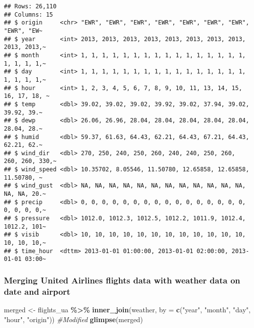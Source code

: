 \documentclass[
]{article}
\newenvironment{Shaded}{\begin{snugshade}}{\end{snugshade}}
\newcommand{\AttributeTok}[1]{\textcolor[rgb]{0.13,0.29,0.53}{#1}}
\newcommand{\CommentTok}[1]{\textcolor[rgb]{0.56,0.35,0.01}{\textit{#1}}}
\newcommand{\FunctionTok}[1]{\textcolor[rgb]{0.13,0.29,0.53}{\textbf{#1}}}
\newcommand{\NormalTok}[1]{#1}
\newcommand{\OtherTok}[1]{\textcolor[rgb]{0.56,0.35,0.01}{#1}}
\newcommand{\SpecialCharTok}[1]{\textcolor[rgb]{0.81,0.36,0.00}{\textbf{#1}}}
\newcommand{\StringTok}[1]{\textcolor[rgb]{0.31,0.60,0.02}{#1}}
\begin{document}
\begin{verbatim}
## Rows: 26,110
## Columns: 15
## $ origin     <chr> "EWR", "EWR", "EWR", "EWR", "EWR", "EWR", "EWR", "EWR", "EW~
## $ year       <int> 2013, 2013, 2013, 2013, 2013, 2013, 2013, 2013, 2013, 2013,~
## $ month      <int> 1, 1, 1, 1, 1, 1, 1, 1, 1, 1, 1, 1, 1, 1, 1, 1, 1, 1, 1, 1,~
## $ day        <int> 1, 1, 1, 1, 1, 1, 1, 1, 1, 1, 1, 1, 1, 1, 1, 1, 1, 1, 1, 1,~
## $ hour       <int> 1, 2, 3, 4, 5, 6, 7, 8, 9, 10, 11, 13, 14, 15, 16, 17, 18, ~
## $ temp       <dbl> 39.02, 39.02, 39.02, 39.92, 39.02, 37.94, 39.02, 39.92, 39.~
## $ dewp       <dbl> 26.06, 26.96, 28.04, 28.04, 28.04, 28.04, 28.04, 28.04, 28.~
## $ humid      <dbl> 59.37, 61.63, 64.43, 62.21, 64.43, 67.21, 64.43, 62.21, 62.~
## $ wind_dir   <dbl> 270, 250, 240, 250, 260, 240, 240, 250, 260, 260, 260, 330,~
## $ wind_speed <dbl> 10.35702, 8.05546, 11.50780, 12.65858, 12.65858, 11.50780, ~
## $ wind_gust  <dbl> NA, NA, NA, NA, NA, NA, NA, NA, NA, NA, NA, NA, NA, NA, 20.~
## $ precip     <dbl> 0, 0, 0, 0, 0, 0, 0, 0, 0, 0, 0, 0, 0, 0, 0, 0, 0, 0, 0, 0,~
## $ pressure   <dbl> 1012.0, 1012.3, 1012.5, 1012.2, 1011.9, 1012.4, 1012.2, 101~
## $ visib      <dbl> 10, 10, 10, 10, 10, 10, 10, 10, 10, 10, 10, 10, 10, 10, 10,~
## $ time_hour  <dttm> 2013-01-01 01:00:00, 2013-01-01 02:00:00, 2013-01-01 03:00~
\end{verbatim}

\subsubsection{Merging United Airlines flights data with weather data on
date and
airport}\label{merging-united-airlines-flights-data-with-weather-data-on-date-and-airport}

\begin{Shaded}
\begin{Highlighting}[]
\NormalTok{merged }\OtherTok{\textless{}{-}}\NormalTok{ flights\_ua }\SpecialCharTok{\%\textgreater{}\%}
  \FunctionTok{inner\_join}\NormalTok{(weather, }\AttributeTok{by =} \FunctionTok{c}\NormalTok{(}\StringTok{"year"}\NormalTok{, }\StringTok{"month"}\NormalTok{, }\StringTok{"day"}\NormalTok{, }\StringTok{"hour"}\NormalTok{, }\StringTok{"origin"}\NormalTok{)) }\CommentTok{\#Modified}
\FunctionTok{glimpse}\NormalTok{(merged)}
\end{Highlighting}
\end{Shaded}
\end{document}
